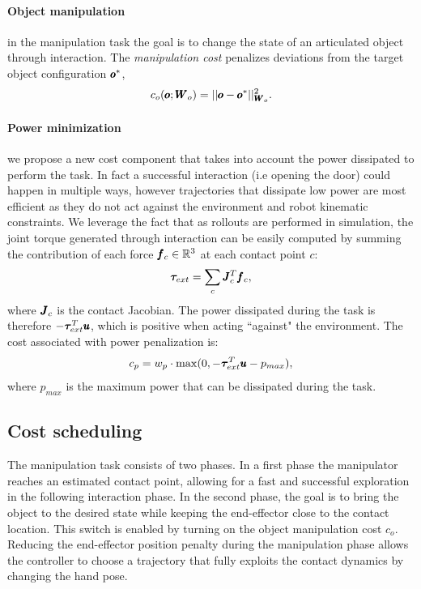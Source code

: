  \paragraph{Object manipulation} in the manipulation task the goal is to change the state of an articulated object through interaction. The \textit{manipulation cost} penalizes deviations from the target object configuration $\pmb{o}^{*}$,
\begin{equation}
    c_o(\pmb{o}; \pmb{W}_{o}) = || \pmb{o} - \pmb{o}^{*}||^2_{\pmb{W}_{o}}.
\end{equation}
\paragraph{Power minimization} we propose a new cost component that takes into account the power dissipated to perform the task. In fact a successful interaction (i.e opening the door) could happen in multiple ways, however trajectories that dissipate low power are most efficient as they do not act against the environment and robot kinematic constraints. We leverage the fact that as rollouts are performed in simulation, the joint torque generated through interaction can be easily computed by summing the contribution of each force $\pmb{f}_c \in \mathbb{R}^{3}$ at each contact point $c$:
\begin{equation}
\boldsymbol{\tau}_{ext} = \sum\limits_{c} \pmb{J}_c^T \pmb{f}_c,    
\end{equation}
where $\pmb{J}_c$ is the contact Jacobian. The power dissipated during the task is therefore $-\boldsymbol{\tau}_{ext}^T\pmb{u}$, which is positive when acting ``against" the environment. The cost associated with power penalization is:
\begin{equation}
   c_p = w_{p} \cdot \max(0, - \boldsymbol{\tau}_{ext}^T\pmb{u} - p_{max}),      
 \end{equation}
where $p_{max}$ is the maximum power that can be dissipated during the task.

\subsection{Cost scheduling}
The manipulation task consists of two phases. In a first phase the manipulator reaches an estimated contact point, allowing for a fast and successful exploration in the following interaction phase. In the second phase, the goal is to bring the object to the desired state while keeping the end-effector close to the contact location. This switch is enabled by turning on the object manipulation cost $c_o$. Reducing the end-effector position penalty during the manipulation phase allows the controller to choose a trajectory that fully exploits the contact dynamics by changing the hand pose. 

